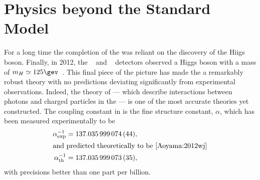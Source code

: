 \section{Physics beyond the Standard Model}
\label{sec:bsm}

For a long time the completion of the \sm was reliant on the discovery of the Hiigs boson.
Finally, in 2012, the \cms~\cite{Chatrchyan:2008aa} and \atlas~\cite{Aad:2008zzm} detectors
observed a Higgs boson with a mass of $m_H\simeq125\gev$~\cite{Chatrchyan:2012ufa,Aad:2012tfa}.
This final piece of the picture has made the \sm a remarkably robust theory with no predictions
deviating significantly from experimental observations.
Indeed, the theory of \QED --- which describe interactions between
photons and charged particles in the \sm --- is one of the most accurate theories yet constructed.
The coupling constant in \QED is the fine structure constant, $\alpha$, which has been measured
experimentally to be~\cite{PDG2012}
\begin{align}
  \alpha^{-1}_\mathrm{exp} &= 137.035\,999\,074\,(44), \nonumber\\
  \intertext{and predicted theoretically to be~\cite{Aoyama:2012wj}}
  \alpha^{-1}_\mathrm{th} &= 137.035\,999\,073\,(35), \nonumber
\end{align}
with precisions better than one part per billion.




